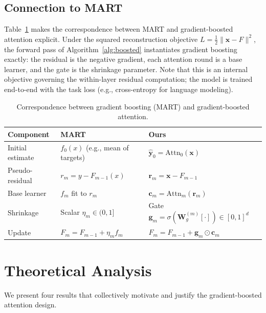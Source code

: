 \documentclass{article}
\theoremstyle{definition}
\begin{document}
\subsection{Connection to MART}
\label{sec:mart_connection}

Table~\ref{tab:mart} makes the correspondence between MART and gradient-boosted attention explicit.
Under the squared reconstruction objective $L = \frac{1}{2}\|\mathbf{x} - F\|^2$, the forward pass of Algorithm~\ref{alg:boosted} instantiates gradient boosting exactly: the residual is the negative gradient, each attention round is a base learner, and the gate is the shrinkage parameter.
Note that this is an internal objective governing the within-layer residual computation; the model is trained end-to-end with the task loss (e.g., cross-entropy for language modeling).

\begin{table}[t]
\centering
\caption{Correspondence between gradient boosting (MART) and gradient-boosted attention.}
\label{tab:mart}
\begin{tabular}{@{}lll@{}}
\toprule
\textbf{Component} & \textbf{MART} \citep{friedman2001greedy} & \textbf{Ours} \\
\midrule
Initial estimate & $f_0(x)$ (e.g., mean of targets) & $\hat{\mathbf{y}}_0 = \mathrm{Attn}_0(\mathbf{x})$ \\
Pseudo-residual & $r_m = y - F_{m-1}(x)$ & $\mathbf{r}_m = \mathbf{x} - F_{m-1}$ \\
Base learner & $f_m$ fit to $r_m$ & $\mathbf{c}_m = \mathrm{Attn}_m(\mathbf{r}_m)$ \\
Shrinkage & Scalar $\eta_m \in (0,1]$ & Gate $\mathbf{g}_m = \sigma(\mathbf{W}_g^{(m)}[\cdot]) \in [0,1]^d$ \\
Update & $F_m = F_{m-1} + \eta_m f_m$ & $F_m = F_{m-1} + \mathbf{g}_m \odot \mathbf{c}_m$ \\
\bottomrule
\end{tabular}
\end{table}


\section{Theoretical Analysis}
\label{sec:theory}

We present four results that collectively motivate and justify the gradient-boosted attention design.
\end{document}
